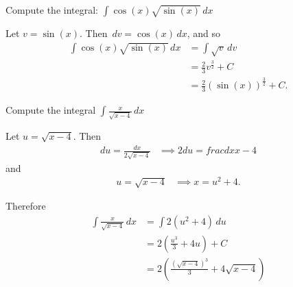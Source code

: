 \documentclass[handout, nooutcomes]{ximera}
\renewenvironment{freeResponse}{
\ifhandout\setbox0\vbox\bgroup\else
\begin{trivlist}\item[\hskip \labelsep\bfseries Solution:\hspace{2ex}]
\fi}
{\ifhandout\egroup\else
\end{trivlist}
\fi}
\renewcommand{\d}{\,d}
\begin{document}
\begin{problem}
Compute the  integral: $\int \cos(x) \sqrt{\sin(x)} \d x$
  \begin{freeResponse}
		Let $v = \sin(x)$.  Then $\d v = \cos(x) \d x$, and so
		\begin{align*}
			\int \cos(x) \sqrt{\sin(x)} \d x &= \int \sqrt{v} \d v  \\
			&= \frac{2}{3} v^{\frac{3}{2}} + C  \\
			&= \frac{2}{3} (\sin(x))^{\frac{3}{2}} + C.
		\end{align*}
	\end{freeResponse}
\end{problem}

\begin{problem}
Compute the integral $\int \frac{x}{\sqrt{x-4}} \d x$
	\begin{freeResponse}
    Let $u = \sqrt{x - 4}$.
    Then
    \begin{align*}
      du = \frac{dx}{2\sqrt{x-4}}
      &\implies 2du = frac{dx}{x-4}
    \end{align*}
    and
    \begin{align*}
      u = \sqrt{x - 4}
      &\implies x = u^2 +4.
    \end{align*}

    Therefore
    \begin{align*}
      \int \frac{x}{\sqrt{x-4}} \d x
      &= \int 2(u^2 + 4) \d u \\
      &= 2\left(\frac{u^3}{3} + 4u \right) + C\\
      &= 2\left(\frac{(\sqrt{x-4})^3}{3} + 4\sqrt{x-4}\right)
    \end{align*}
	\end{freeResponse}
\end{problem}
\end{document}
